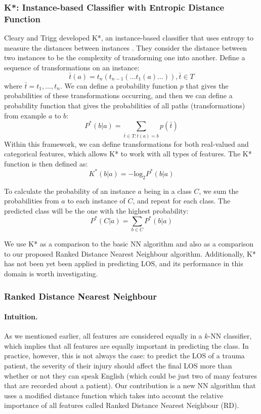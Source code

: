 \documentclass{article}
\begin{document}
\subsubsection{K*: Instance-based Classifier with Entropic Distance Function}
Cleary and Trigg developed K*, an instance-based classifier that uses entropy
to measure the distances between instances \cite{Cleary1995}. They consider
the distance between two instances to be the complexity of transforming one
into another. Define a sequence of transformations on an instance:
\begin{equation*}
\bar{t}(a) = t_n(t_{n-1}(\ldots t_1(a)\ldots)), \bar{t} \in T
\end{equation*}
where $\bar{t} = t_1,\ldots,t_n$. We can define a probability function $p$
that gives the probabilities of these transformations occurring, and then we
can define a probability function that gives the probabilities of all paths
(transformations) from example $a$ to $b$:
\begin{equation*}
P^*(b|a) = \sum_{\bar{t}\in T:\bar{t}(a)=b} p(\bar{t})
\end{equation*}
Within this framework, we can define transformations for both real-valued and
categorical features, which allows K* to work with all types of features.
The K* function is then defined as:
\begin{equation*}
K^*(b|a) = -\mathrm{log}_2P^*(b|a)
\end{equation*}

To calculate the probability of an instance $a$ being in a class $C$, we sum
the probabilities from $a$ to each instance of $C$, and repeat for each class.
The predicted class will be the one with the highest probability:
\begin{equation*}
P^*(C|a) = \sum_{b\in C} P^*(b|a)
\end{equation*}

We use K* as a comparison to the basic NN algorithm and also as a comparison
to our proposed Ranked Distance Nearest Neighbour algorithm. Additionally,
K* has not been yet been applied in predicting LOS, and its performance in this
domain is worth investigating.

\subsubsection{Ranked Distance Nearest Neighbour}
\paragraph{Intuition.}
As we mentioned earlier, all features are considered equally in a $k$-NN
classifier, which implies that all features are equally important in predicting
the class. In practice, however, this is not always the case: to predict the
LOS of a trauma patient, the severity of their injury should affect the final
LOS more than whether or not they can speak English (which could be just two
of many features that are recorded about a patient). Our contribution is a
new NN algorithm that uses a modified distance function which takes into
account the relative importance of all features called Ranked Distance
Nearest Neighbour (RD).
\end{document}
